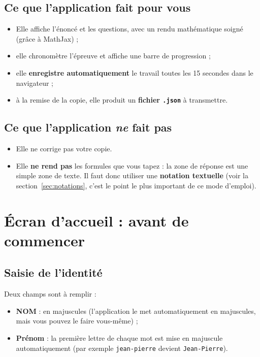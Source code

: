 \documentclass[11pt,a4paper]{article}
\begin{document}
\subsection*{Ce que l'application fait pour vous}
\begin{itemize}
  \item Elle affiche l'énoncé et les questions, avec un rendu mathématique soigné
        (grâce à MathJax) ;
  \item elle chronomètre l'épreuve et affiche une barre de progression ;
  \item elle \textbf{enregistre automatiquement} le travail toutes les 15 secondes
        dans le navigateur ;
  \item à la remise de la copie, elle produit un \textbf{fichier \texttt{.json}}
        à transmettre.
\end{itemize}

\subsection*{Ce que l'application \emph{ne} fait pas}
\begin{itemize}
  \item Elle ne corrige pas votre copie.
  \item Elle \textbf{ne rend pas} les formules que vous tapez : la zone de réponse est
        une simple zone de texte. Il faut donc utiliser une \textbf{notation textuelle}
        (voir la section~\ref{sec:notations}, c'est le point le plus important de ce
        mode d'emploi).
\end{itemize}

\section{Écran d'accueil : avant de commencer}

\subsection{Saisie de l'identité}

Deux champs sont à remplir :
\begin{itemize}
  \item \textbf{NOM} : en majuscules (l'application le met automatiquement en
        majuscules, mais vous pouvez le faire vous-même) ;
  \item \textbf{Prénom} : la première lettre de chaque mot est mise en majuscule
        automatiquement (par exemple \texttt{jean-pierre} devient
        \texttt{Jean-Pierre}).
\end{itemize}
\end{document}
